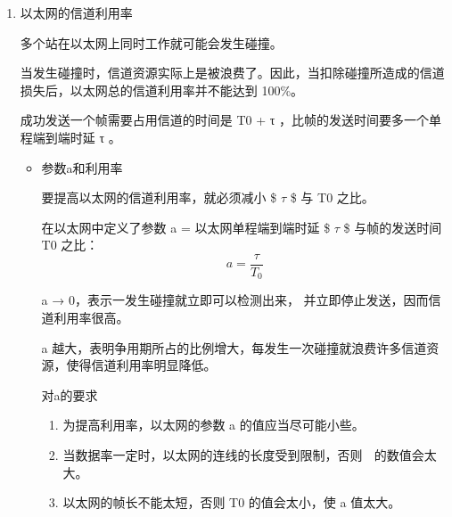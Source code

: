 \documentclass[11pt]{article}
\begin{document}
\begin{enumerate}
\begin{enumerate}
\item 使用集线器的星型拓扑
\label{sec:org15a1343}
采用双绞线的以太网采用星形拓扑。

在星形的中心则增加了一种可靠性非常高的设备，叫做集线器 (hub)。

集线器特点：
\begin{enumerate}
\item 使用电子器件来模拟实际电缆线的工作，因此整个系统仍然像一个传统的以太网那样运行。
\item 使用集线器的以太网在逻辑上仍是一个总线网，各工作站使用的还是 CSMA/CD 协议，并共享逻辑上的总线。
\item 很像一个多接口的转发器，工作在物理层。
\item 采用了专门芯片，进行自适应串音回波抵消，减少了近端串音。
\end{enumerate}
\end{enumerate}

\item 以太网的信道利用率
\label{sec:org7ad3899}

多个站在以太网上同时工作就可能会发生碰撞。

当发生碰撞时，信道资源实际上是被浪费了。因此，当扣除碰撞所造成的信道损失后，以太网总的信道利用率并不能达到 100\%。

成功发送一个帧需要占用信道的时间是 T0 + τ ，比帧的发送时间要多一个单程端到端时延 τ 。

\begin{itemize}
\item 参数a和利用率

要提高以太网的信道利用率，就必须减小 \$ \(\tau\) \$ 与 T0 之比。

在以太网中定义了参数 a = 以太网单程端到端时延 \$ \(\tau\) \$ 与帧的发送时间 T0 之比：
\[
    a = \frac{ \tau }{T_0}
  \]

a → 0，表示一发生碰撞就立即可以检测出来， 并立即停止发送，因而信道利用率很高。

a 越大，表明争用期所占的比例增大，每发生一次碰撞就浪费许多信道资源，使得信道利用率明显降低。

对a的要求
\begin{enumerate}
\item 为提高利用率，以太网的参数 a 的值应当尽可能小些。

\item 当数据率一定时，以太网的连线的长度受到限制，否则   的数值会太大。

\item 以太网的帧长不能太短，否则 T0 的值会太小，使 a 值太大。
\end{enumerate}


\end{itemize}
\end{enumerate}
\end{document}
